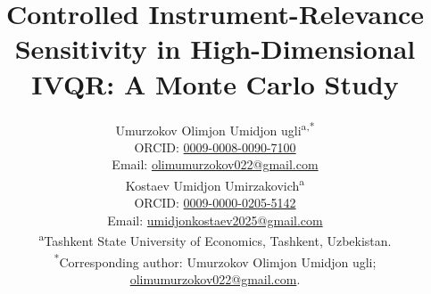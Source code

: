 
\title{Controlled Instrument-Relevance Sensitivity in High-Dimensional IVQR: A Monte Carlo Study}
\author{\begin{minipage}{\dimexpr\textwidth-2\tabcolsep\relax}\centering
\normalsize Umurzokov Olimjon Umidjon ugli\textsuperscript{a,*}\\
\small ORCID: \href{https://orcid.org/0009-0008-0090-7100}{0009-0008-0090-7100}\\
Email: \href{mailto:olimumurzokov022@gmail.com}{olimumurzokov022@gmail.com}\\[0.7em]
\normalsize Kostaev Umidjon Umirzakovich\textsuperscript{a}\\
\small ORCID: \href{https://orcid.org/0009-0000-0205-5142}{0009-0000-0205-5142}\\
Email: \href{mailto:umidjonkostaev2025@gmail.com}{umidjonkostaev2025@gmail.com}\\[0.7em]
\textsuperscript{a}Tashkent State University of Economics, Tashkent, Uzbekistan.\\[0.4em]
\textsuperscript{*}Corresponding author: Umurzokov Olimjon Umidjon ugli;\\
\href{mailto:olimumurzokov022@gmail.com}{olimumurzokov022@gmail.com}.
\end{minipage}}
\date{}

\maketitle

